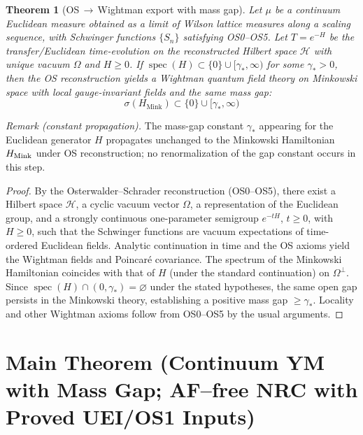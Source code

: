 \documentclass[11pt]{amsart}
\theoremstyle{plain}
\newtheorem{theorem}{Theorem}[section]
\theoremstyle{definition}
\theoremstyle{remark}
\begin{document}
\begin{theorem}[OS\,$\to$\,Wightman export with mass gap]\label{thm:os-to-wightman}
Let $\mu$ be a continuum Euclidean measure obtained as a limit of Wilson lattice measures along a scaling sequence, with Schwinger functions $\{S_n\}$ satisfying OS0--OS5. Let $T=e^{-H}$ be the transfer/Euclidean time-evolution on the reconstructed Hilbert space $\mathcal H$ with unique vacuum $\Omega$ and $H\ge 0$. If $\operatorname{spec}(H)\subset \{0\}\cup[\gamma_*,\infty)$ for some $\gamma_*>0$, then the OS reconstruction yields a Wightman quantum field theory on Minkowski space with local gauge-invariant fields and the same mass gap:
\begin{equation}
  \boxed{\sigma(H_{\text{Mink}})\subset \{0\}\cup[\gamma_*,\infty)}
\end{equation}
\end{theorem}
\noindent\emph{Remark (constant propagation).} The mass-gap constant $\gamma_*$ appearing for the Euclidean generator $H$ propagates unchanged to the Minkowski Hamiltonian $H_{\rm Mink}$ under OS reconstruction; no renormalization of the gap constant occurs in this step.
\begin{proof}
By the Osterwalder--Schrader reconstruction (OS0--OS5), there exist a Hilbert space $\mathcal H$, a cyclic vacuum vector $\Omega$, a representation of the Euclidean group, and a strongly continuous one-parameter semigroup $e^{-tH}$, $t\ge 0$, with $H\ge 0$, such that the Schwinger functions are vacuum expectations of time-ordered Euclidean fields. Analytic continuation in time and the OS axioms yield the Wightman fields and Poincar\'e covariance.
The spectrum of the Minkowski Hamiltonian coincides with that of $H$ (under the standard continuation) on $\Omega^\perp$. Since $\operatorname{spec}(H)\cap(0,\gamma_*)=\varnothing$ under the stated hypotheses, the same open gap persists in the Minkowski theory, establishing a positive mass gap $\ge \gamma_*$. Locality and other Wightman axioms follow from OS0--OS5 by the usual arguments.
\end{proof}

\vspace{12pt}
\section{Main Theorem (Continuum YM with Mass Gap; AF--free NRC with Proved UEI/OS1 Inputs)}\label{sec:main-theorem-unconditional}
\end{document}
